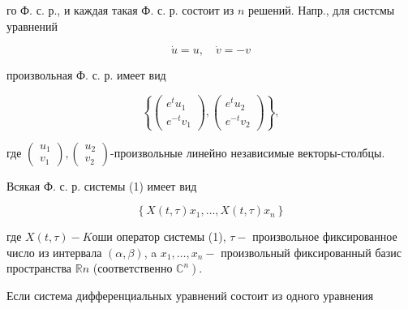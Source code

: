 \documentclass[10pt]{article}
\begin{document}
го Ф. с. р., и каждая такая Ф. с. р. состоит из $n$ решений. Напр., для систсмы уравнений



\[

\dot{u}=u, \quad \dot{v}=-v

\]



произвольная Ф. с. р. имеет вид



\[

\left\{\left(\begin{array}{l}

e^{t} u_{1} \\

e^{-t} v_{1}

\end{array}\right),\left(\begin{array}{l}

e^{t} u_{2} \\

e^{-t} v_{2}

\end{array}\right)\right\},

\]



где $\left(\begin{array}{l}u_{1} \\ v_{1}\end{array}\right),\left(\begin{array}{l}u_{2} \\ v_{2}\end{array}\right)$-произвольные линейно независимые векторы-столбцы.



Всякая Ф. с. р. системы (1) имеет вид



\[

\left\{X(t, \tau) x_{1}, \ldots, X(t, \tau) x_{n}\right\}

\]



где $X(t, \tau)-K о ш и$ оператор системы (1), $\tau-$ произвольное фиксированное число из интервала $(\alpha, \beta)$, a $x_{1}, \ldots, x_{n}-$ произвольный фиксированный базис пространства $\mathbb{R} n$ (соответственно $\left.\mathbb{C}^{n}\right)$.



Если система дифференциальных уравнений состоит из одного уравнения
\end{document}

